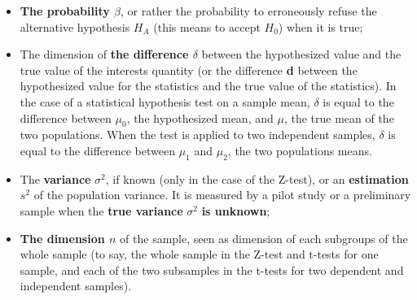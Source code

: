 \begin{frame}
  \vspace*{.5cm}
  \begin{itemize}
    \item \textbf{The probability {\boldmath${\beta}$}}, or rather the probability to erroneously refuse the alternative hypothesis $ H_A $ (this means to accept $H_0$) when it is true;
    \vspace*{.5cm}
    \item The dimension of \textbf{the difference {\boldmath${\delta}$}} between the hypothesized value and the true value of the interests quantity (or the difference \textbf{d} between the hypothesized value for the statistics and the true value of the statistics). In the case of a statistical hypothesis test on a sample mean, ${\delta}$ is equal to the difference between $\mu_0$, the hypothesized mean, and $\mu$, the true mean of the two populations. When the test is applied to two independent samples, ${\delta}$ is equal to the difference between $\mu_1$ and $\mu_2$, the two populations means.
  \end{itemize}
\end{frame}

\begin{frame}
  \vspace*{.25cm}
  \begin{itemize}
    \item The \textbf{variance}{ \boldmath $ \sigma^2 $}, if known (only in the case of the Z-test), or an \textbf{estimation} {\boldmath $ {s^2} $} of the population variance. It is measured by a pilot study or a preliminary sample when the \textbf{true variance} {\boldmath$\sigma^2$} \textbf{is unknown};
    \vspace*{.25cm}
    \item \textbf{The dimension {\boldmath $ n $}} of the sample, seen as dimension of each subgroups of the whole sample (to say, the whole sample in the Z-test and t-tests for one sample, and each of the two subsamples in the t-tests for two dependent and independent samples).
  \end{itemize}
\end{frame}



